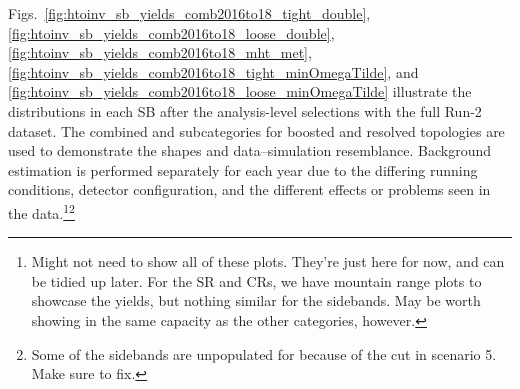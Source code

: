 Figs.~\ref{fig:htoinv_sb_yields_comb2016to18_tight_double}, \ref{fig:htoinv_sb_yields_comb2016to18_loose_double}, \ref{fig:htoinv_sb_yields_comb2016to18_mht_met}, \ref{fig:htoinv_sb_yields_comb2016to18_tight_minOmegaTilde}, and \ref{fig:htoinv_sb_yields_comb2016to18_loose_minOmegaTilde} illustrate the \ptmiss distributions in each \gls{SB} after the analysis-level selections with the full Run-2 dataset. The combined \ttH and \VH subcategories for boosted and resolved topologies are used to demonstrate the shapes and data--simulation resemblance. Background estimation is performed separately for each year due to the differing running conditions, detector configuration, and the different effects or problems seen in the data.\footnote{Might not need to show all of these plots. They're just here for now, and can be tidied up later. For the SR and CRs, we have mountain range plots to showcase the yields, but nothing similar for the sidebands. May be worth showing \ggH in the same capacity as the other categories, however.}\footnote{Some of the sidebands are unpopulated for \VH because of the \mindphi cut in scenario 5. Make sure to fix.}

